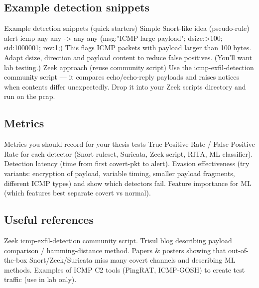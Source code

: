 \subsection{Example detection snippets}
Example detection snippets (quick starters) 
%
Simple Snort-like idea (pseudo-rule)
alert icmp any any -> any any (msg:"ICMP large payload"; dsize:>100; sid:1000001; rev:1;)
This flags ICMP packets with payload larger than 100 bytes. Adapt dsize, direction and payload content 
to reduce false positives. (You’ll want lab testing.) 
%
Zeek approach (reuse community script)
Use the icmp-exfil-detection community script — it compares echo/echo-reply payloads and raises notices 
when contents differ unexpectedly. Drop it into your Zeek scripts directory and run on the pcap.

\subsection{Metrics} 
Metrics you should record for your thesis tests 
%
True Positive Rate / False Positive Rate for each detector (Snort ruleset, Suricata, Zeek script, RITA, ML classifier). 
%
Detection latency (time from first covert-pkt to alert). 
%
Evasion effectiveness (try variants: encryption of payload, variable timing, smaller payload fragments, different ICMP types) and show which detectors fail. 
%
Feature importance for ML (which features best separate covert vs normal). 

\subsection{Useful references} 
Zeek icmp-exfil-detection community script. 
Trisul blog describing payload comparison / hamming-distance method. 
Papers \& posters showing that out-of-the-box Snort/Zeek/Suricata miss many covert channels and describing ML methods. 
Examples of ICMP C2 tools (PingRAT, ICMP-GOSH) to create test traffic (use in lab only). 

